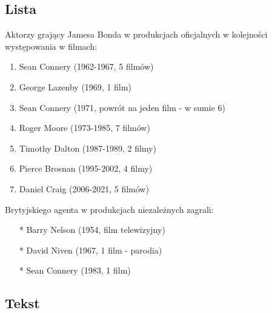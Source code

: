 \subsection{Lista}
Aktorzy grający Jamesa Bonda w produkcjach oficjalnych w kolejności występowania w filmach:
\begin{enumerate}
    \item Sean Connery (1962-1967, 5 filmów)
    \item George Lazenby (1969, 1 film)
    \item Sean Connery (1971, powrót na jeden film - w sumie 6)
    \item Roger Moore (1973-1985, 7 filmów)
    \item Timothy Dalton (1987-1989, 2 filmy)
    \item Pierce Brosnan (1995-2002, 4 filmy)
    \item Daniel Craig (2006-2021, 5 filmów)
\end{enumerate}
Brytyjskiego agenta w produkcjach niezależnych zagrali:
\begin{itemize}
    \item[*] Barry Nelson (1954, film telewizyjny)
    \item[*] David Niven (1967, 1 film - parodia)
    \item[*] Sean Connery (1983, 1 film)
\end{itemize}

\subsection{Tekst}

